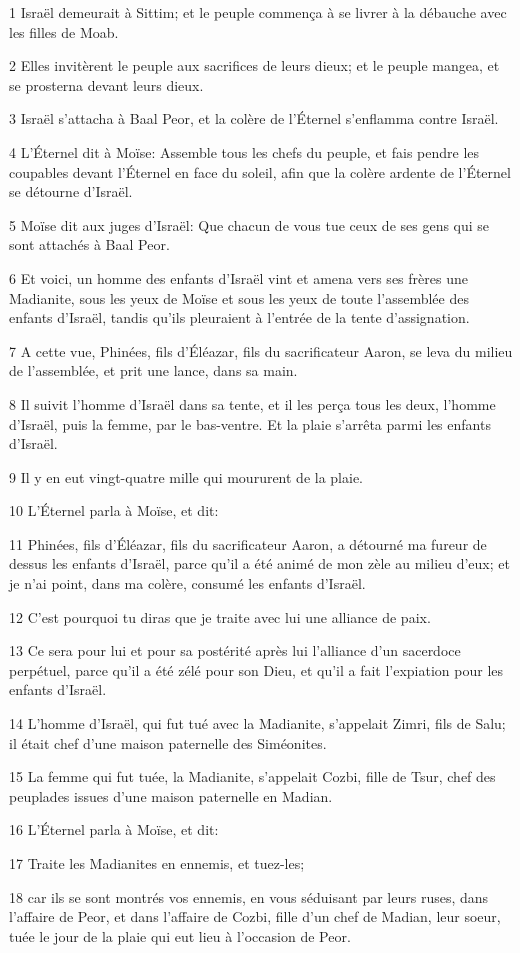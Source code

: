 \par 1 Israël demeurait à Sittim; et le peuple commença à se livrer à la débauche avec les filles de Moab.
\par 2 Elles invitèrent le peuple aux sacrifices de leurs dieux; et le peuple mangea, et se prosterna devant leurs dieux.
\par 3 Israël s'attacha à Baal Peor, et la colère de l'Éternel s'enflamma contre Israël.
\par 4 L'Éternel dit à Moïse: Assemble tous les chefs du peuple, et fais pendre les coupables devant l'Éternel en face du soleil, afin que la colère ardente de l'Éternel se détourne d'Israël.
\par 5 Moïse dit aux juges d'Israël: Que chacun de vous tue ceux de ses gens qui se sont attachés à Baal Peor.
\par 6 Et voici, un homme des enfants d'Israël vint et amena vers ses frères une Madianite, sous les yeux de Moïse et sous les yeux de toute l'assemblée des enfants d'Israël, tandis qu'ils pleuraient à l'entrée de la tente d'assignation.
\par 7 A cette vue, Phinées, fils d'Éléazar, fils du sacrificateur Aaron, se leva du milieu de l'assemblée, et prit une lance, dans sa main.
\par 8 Il suivit l'homme d'Israël dans sa tente, et il les perça tous les deux, l'homme d'Israël, puis la femme, par le bas-ventre. Et la plaie s'arrêta parmi les enfants d'Israël.
\par 9 Il y en eut vingt-quatre mille qui moururent de la plaie.
\par 10 L'Éternel parla à Moïse, et dit:
\par 11 Phinées, fils d'Éléazar, fils du sacrificateur Aaron, a détourné ma fureur de dessus les enfants d'Israël, parce qu'il a été animé de mon zèle au milieu d'eux; et je n'ai point, dans ma colère, consumé les enfants d'Israël.
\par 12 C'est pourquoi tu diras que je traite avec lui une alliance de paix.
\par 13 Ce sera pour lui et pour sa postérité après lui l'alliance d'un sacerdoce perpétuel, parce qu'il a été zélé pour son Dieu, et qu'il a fait l'expiation pour les enfants d'Israël.
\par 14 L'homme d'Israël, qui fut tué avec la Madianite, s'appelait Zimri, fils de Salu; il était chef d'une maison paternelle des Siméonites.
\par 15 La femme qui fut tuée, la Madianite, s'appelait Cozbi, fille de Tsur, chef des peuplades issues d'une maison paternelle en Madian.
\par 16 L'Éternel parla à Moïse, et dit:
\par 17 Traite les Madianites en ennemis, et tuez-les;
\par 18 car ils se sont montrés vos ennemis, en vous séduisant par leurs ruses, dans l'affaire de Peor, et dans l'affaire de Cozbi, fille d'un chef de Madian, leur soeur, tuée le jour de la plaie qui eut lieu à l'occasion de Peor.

